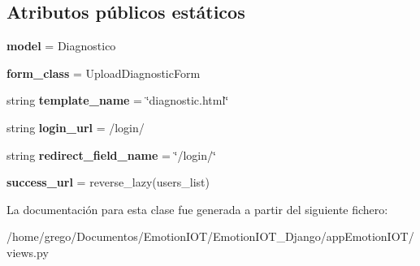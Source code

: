 \subsection*{Atributos públicos estáticos}
\begin{DoxyCompactItemize}
\item 
{\bfseries model} = Diagnostico\hypertarget{classappEmotionIOT_1_1views_1_1Update__diagnostic_a540229f310a90b50a70464b46cf688f3}{}\label{classappEmotionIOT_1_1views_1_1Update__diagnostic_a540229f310a90b50a70464b46cf688f3}

\item 
{\bfseries form\+\_\+class} = Upload\+Diagnostic\+Form\hypertarget{classappEmotionIOT_1_1views_1_1Update__diagnostic_af0dde2cd6e45e85ab6c4bafb6ad54369}{}\label{classappEmotionIOT_1_1views_1_1Update__diagnostic_af0dde2cd6e45e85ab6c4bafb6ad54369}

\item 
string {\bfseries template\+\_\+name} = \char`\"{}diagnostic.\+html\char`\"{}\hypertarget{classappEmotionIOT_1_1views_1_1Update__diagnostic_a0323101df216296b817280926d922427}{}\label{classappEmotionIOT_1_1views_1_1Update__diagnostic_a0323101df216296b817280926d922427}

\item 
string {\bfseries login\+\_\+url} = \textquotesingle{}/login/\textquotesingle{}\hypertarget{classappEmotionIOT_1_1views_1_1Update__diagnostic_a0c33e2788d4535edce5045d19878618d}{}\label{classappEmotionIOT_1_1views_1_1Update__diagnostic_a0c33e2788d4535edce5045d19878618d}

\item 
string {\bfseries redirect\+\_\+field\+\_\+name} = \char`\"{}/login/\char`\"{}\hypertarget{classappEmotionIOT_1_1views_1_1Update__diagnostic_aec7313047b102446404860c60ad0eaae}{}\label{classappEmotionIOT_1_1views_1_1Update__diagnostic_aec7313047b102446404860c60ad0eaae}

\item 
{\bfseries success\+\_\+url} = reverse\+\_\+lazy(\textquotesingle{}users\+\_\+list\textquotesingle{})\hypertarget{classappEmotionIOT_1_1views_1_1Update__diagnostic_a48c6abc0bd4aada2baa119a092a9349f}{}\label{classappEmotionIOT_1_1views_1_1Update__diagnostic_a48c6abc0bd4aada2baa119a092a9349f}

\end{DoxyCompactItemize}


La documentación para esta clase fue generada a partir del siguiente fichero\+:\begin{DoxyCompactItemize}
\item 
/home/grego/\+Documentos/\+Emotion\+I\+O\+T/\+Emotion\+I\+O\+T\+\_\+\+Django/app\+Emotion\+I\+O\+T/views.\+py\end{DoxyCompactItemize}
